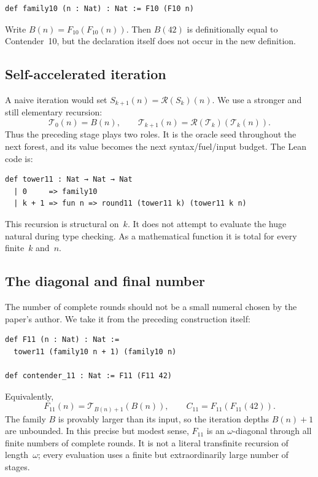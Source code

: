 \documentclass[11pt]{article}
\theoremstyle{definition}
\theoremstyle{remark}
\newcommand{\Round}{\mathcal R}
\newcommand{\Tower}{\mathcal T}
\newcommand{\lean}[1]{\texttt{\detokenize{#1}}}
\newcommand{\Celeven}{C_{11}}
\newcommand{\Bfam}{B}
\begin{document}
\begin{lstlisting}
def family10 (n : Nat) : Nat := F10 (F10 n)
\end{lstlisting}

Write $\Bfam(n)=F_{10}(F_{10}(n))$. Then $\Bfam(42)$ is definitionally equal to
Contender~10, but the declaration \lean{contender_10} itself does not occur in
the new definition.

\subsection{Self-accelerated iteration}

A naive iteration would set
$S_{k+1}(n)=\Round(S_k)(n)$. We use a stronger and still elementary recursion:
\[
  \Tower_0(n)=\Bfam(n),
  \qquad
  \Tower_{k+1}(n)=\Round(\Tower_k)(\Tower_k(n)).
\]
Thus the preceding stage plays two roles. It is the oracle seed throughout the
next forest, and its value becomes the next syntax/fuel/input budget. The Lean
code is:

\begin{lstlisting}
def tower11 : Nat → Nat → Nat
  | 0     => family10
  | k + 1 => fun n => round11 (tower11 k) (tower11 k n)
\end{lstlisting}

This recursion is structural on~$k$. It does not attempt to evaluate the huge
natural during type checking. As a mathematical function it is total for every
finite~$k$ and~$n$.

\subsection{The diagonal and final number}

The number of complete rounds should not be a small numeral chosen by the
paper's author. We take it from the preceding construction itself:

\begin{lstlisting}
def F11 (n : Nat) : Nat :=
  tower11 (family10 n + 1) (family10 n)

def contender_11 : Nat := F11 (F11 42)
\end{lstlisting}

Equivalently,
\[
  F_{11}(n)=\Tower_{\Bfam(n)+1}(\Bfam(n)),
  \qquad
  \Celeven=F_{11}(F_{11}(42)).
\]
The family $\Bfam$ is provably larger than its input, so the iteration depths
$\Bfam(n)+1$ are unbounded. In this precise but modest sense, $F_{11}$ is an
$\omega$-diagonal through all finite numbers of complete rounds. It is not a
literal transfinite recursion of length~$\omega$; every evaluation uses a finite
but extraordinarily large number of stages.
\end{document}
